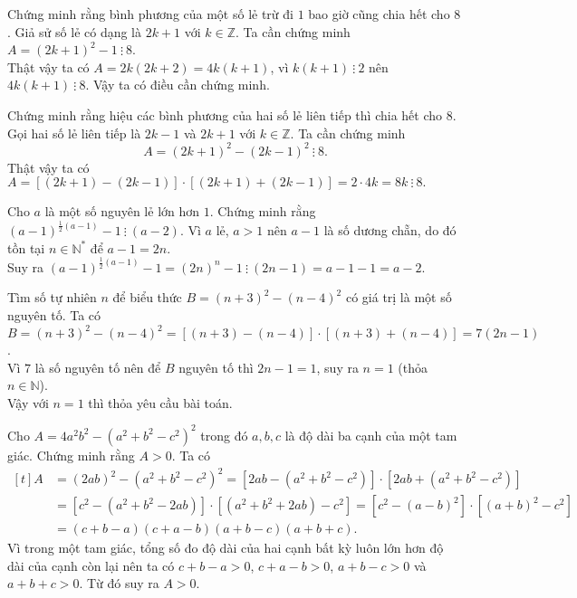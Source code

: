 \begin{vn}
	Chứng minh rằng bình phương của một số lẻ trừ đi $1$ bao giờ cũng chia hết cho $8$.
	\loigiai 
	{
		Giả sử số lẻ có dạng là $2k+1$ với $k \in \mathbb{Z}$. Ta cần chứng minh $A = (2k+1)^2 - 1 \ \vdots \ 8$.\\
		Thật vậy ta có $A = 2k(2k+2) = 4k(k+1)$, vì $k(k+1) \ \vdots \ 2$ nên $4k(k+1) \ \vdots \ 8$. Vậy ta có điều cần chứng minh.
	}
\end{vn}

\begin{vn}
	Chứng minh rằng hiệu các bình phương của hai số lẻ liên tiếp thì chia hết cho $8$.
	\loigiai 
	{
		Gọi hai số lẻ liên tiếp là $2k-1$ và $2k+1$ với $k \in \mathbb{Z}$. Ta cần chứng minh 
		\[A = ( 2k+1)^2 - (2k-1)^2 \ \vdots \ 8.\]
		Thật vậy ta có $A = [(2k+1) - (2k-1)]\cdot [(2k+1)+(2k-1)] = 2 \cdot 4k = 8k \ \vdots \ 8.$
	}
\end{vn}

\begin{vn}
	Cho $a$ là một số nguyên lẻ lớn hơn $1$. Chứng minh rằng $(a-1)^{\frac{1}{2}(a-1)}-1 \ \vdots \ (a-2)$.
	\loigiai 
	{
		Vì $a$ lẻ, $a>1$ nên $a-1$ là số dương chẵn, do đó tồn tại $n \in \mathbb{N^*}$ để $a - 1 = 2n$.\\
		Suy ra $(a-1)^{\frac{1}{2}(a-1)} - 1 = (2n)^n - 1 \ \vdots \ (2n-1) = a-1-1 = a-2$.
	}
\end{vn}

\begin{vn}
	Tìm số tự nhiên $n$ để biểu thức $B = (n+3)^2 - (n-4)^2$ có giá trị là một số nguyên tố.
	\loigiai 
	{
		Ta có $B = (n+3)^2 - (n-4)^2 = [(n+3) - (n - 4)] \cdot [(n+3) + (n-4)] = 7(2n-1)$. \\
		Vì $7$ là số nguyên tố nên để $B$ nguyên tố thì $2n-1 = 1$, suy ra $n = 1$ (thỏa $n \in \mathbb{N}$). \\
		Vậy với $n = 1$ thì thỏa yêu cầu bài toán.
	}
\end{vn}

\begin{vn}
	Cho $A = 4a^2b^2 - \left(a^2 + b^2 - c^2\right)^2$ trong đó $a,b,c$ là độ dài ba cạnh của một tam giác. Chứng minh rằng $A>0$.
	\loigiai 
	{
		Ta có 
		{\allowdisplaybreaks
		$\begin{aligned}[t]
		A &= (2ab)^2 - \left(a^2 + b^2 - c^2\right)^2 = \left[2ab - \left(a^2 + b^2 - c^2\right)\right] \cdot \left[2ab + (a^2 + b^2 - c^2)\right] \\
		&= \left[c^2 - \left(a^2 + b^2 - 2ab\right)\right] \cdot \left[\left(a^2 + b^2 + 2ab\right) - c^2\right] = \left[c^2 - (a-b)^2\right] \cdot \left[(a+b)^2 - c^2\right] \\
		&=(c+b-a)(c+a-b)(a+b-c)(a+b+c).
		\end{aligned}$ \\
		}
		Vì trong một tam giác, tổng số đo độ dài của hai cạnh bất kỳ luôn lớn hơn độ dài của cạnh còn lại nên ta có $c+b-a>0$, $c+a-b>0$, $a+b-c>0$ và $a+b+c>0$. Từ đó suy ra $A>0$.
	}
\end{vn}
